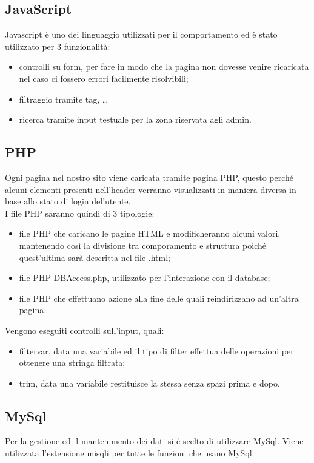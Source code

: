   \subsection{JavaScript}
  Javascript è uno dei linguaggio utilizzati per il comportamento ed è stato utilizzato per 3 funzionalità:
  \begin{itemize}
    \item controlli su form, per fare in modo che la pagina non dovesse venire ricaricata nel caso ci fossero errori facilmente risolvibili;
    \item filtraggio tramite tag, \dots
    \item ricerca tramite input testuale per la zona riservata agli admin.
  \end{itemize}

  \subsection{PHP}
  Ogni pagina nel nostro sito viene caricata tramite pagina PHP, questo perché alcuni elementi presenti nell'header verranno visualizzati in maniera diversa in base allo stato di login del'utente. \\
  I file PHP saranno quindi di 3 tipologie:
  \begin{itemize}
    \item file PHP che caricano le pagine HTML e modificheranno alcuni valori, mantenendo così la divisione tra comporamento e struttura poiché quest'ultima sarà descritta nel file .html;
    \item file PHP DBAccess.php, utilizzato per l'interazione con il database;
    \item file PHP che effettuano azione alla fine delle quali reindirizzano ad un'altra pagina.
  \end{itemize}

  Vengono eseguiti controlli sull'input, quali:
  \begin{itemize}
    \item filter\textunderscore var, data una variabile ed il tipo di filter effettua delle operazioni per ottenere una stringa filtrata;
    \item trim, data una variabile restituisce la stessa senza spazi prima e dopo.
  \end{itemize}

  \subsection{MySql}
  Per la gestione ed il mantenimento dei dati si é scelto di utilizzare MySql. Viene utilizzata l'estensione misqli per tutte le funzioni che usano MySql.